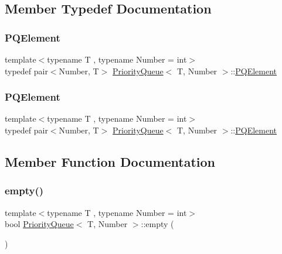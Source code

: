 \subsection{Member Typedef Documentation}
\mbox{\label{structPriorityQueue_ae86a19aae3f9a32a1d76dfdab34eb70b}} 
\subsubsection{\texorpdfstring{P\+Q\+Element}{PQElement}\hspace{0.1cm}{\footnotesize\ttfamily [1/2]}}
{\footnotesize\ttfamily template$<$typename T , typename Number  = int$>$ \\
typedef pair$<$Number, T$>$ \mbox{\hyperlink{structPriorityQueue}{Priority\+Queue}}$<$ T, Number $>$\+::\mbox{\hyperlink{structPriorityQueue_ae86a19aae3f9a32a1d76dfdab34eb70b}{P\+Q\+Element}}}

\mbox{\label{structPriorityQueue_ae86a19aae3f9a32a1d76dfdab34eb70b}} 
\subsubsection{\texorpdfstring{P\+Q\+Element}{PQElement}\hspace{0.1cm}{\footnotesize\ttfamily [2/2]}}
{\footnotesize\ttfamily template$<$typename T , typename Number  = int$>$ \\
typedef pair$<$Number, T$>$ \mbox{\hyperlink{structPriorityQueue}{Priority\+Queue}}$<$ T, Number $>$\+::\mbox{\hyperlink{structPriorityQueue_ae86a19aae3f9a32a1d76dfdab34eb70b}{P\+Q\+Element}}}



\subsection{Member Function Documentation}
\mbox{\label{structPriorityQueue_a422e38d0c3b8398dc6e4867bb4ceec41}} 
\subsubsection{\texorpdfstring{empty()}{empty()}\hspace{0.1cm}{\footnotesize\ttfamily [1/2]}}
{\footnotesize\ttfamily template$<$typename T , typename Number  = int$>$ \\
bool \mbox{\hyperlink{structPriorityQueue}{Priority\+Queue}}$<$ T, Number $>$\+::empty (\begin{DoxyParamCaption}{ }\end{DoxyParamCaption})\hspace{0.3cm}{\ttfamily [inline]}}

